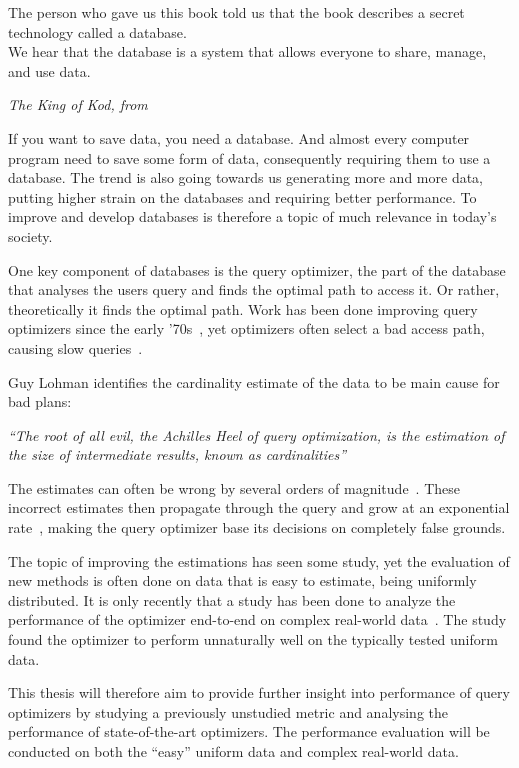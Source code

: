 \epigraph{The person who gave us this book told us that the book describes a
  secret technology called a database.\\
We hear that the database is a system that allows everyone to share, manage, and use data.}{\textit{The King of Kod, from~\cite[p. 6]{takahashi_2009_manga_tmgtd}}}

If you want to save data, you need a database. And almost every computer program need to save some form of data, consequently requiring them to use a database. The trend is also going towards us generating more and more data, putting higher strain on the databases and requiring better performance. To improve and develop databases is therefore a topic of much relevance in today's society.

One key component of databases is the query optimizer, the part of the database that analyses the users query and finds the optimal path to access it. Or rather, theoretically it finds the optimal path. Work has been done improving query optimizers since the early '70s~\cite{chaudhuri_1998_overview_aooqoirs}, yet optimizers often select a bad access path, causing slow queries~\cite{leis_2015_how_hgaqor}.

Guy Lohman identifies the cardinality estimate of the data to be main cause for bad plans:

\textit{``The root of all evil, the Achilles Heel of query optimization, is the estimation of the size of intermediate results, known as cardinalities''}

The estimates can often be wrong by several orders of magnitude~\cite{lohman_query_iqoap}. These incorrect estimates then propagate through the query and grow at an exponential rate~\cite{ioannidis_1991_propagation_otpoeitsojr}, making the query optimizer base its decisions on completely false grounds.

The topic of improving the estimations has seen some study, yet the evaluation of new methods is often done on data that is easy to estimate, being uniformly distributed. It is only recently that a study has been done to analyze the performance of the optimizer end-to-end on complex real-world data~\cite{leis_2015_how_hgaqor}. The study found the optimizer to perform unnaturally well on the typically tested uniform data.

This thesis will therefore aim to provide further insight into performance of query optimizers by studying a previously unstudied metric and analysing the performance of state-of-the-art optimizers. The performance evaluation will be conducted on both the ``easy'' uniform data and complex real-world data.

